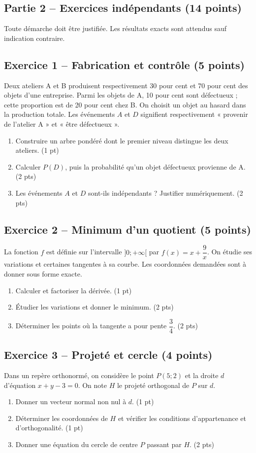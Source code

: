 \clearpage\subsection*{Partie 2 -- Exercices indépendants (14 points)}
Toute démarche doit être justifiée. Les résultats exacts sont attendus sauf indication contraire.
\subsection*{Exercice 1 -- Fabrication et contrôle (5 points)}
Deux ateliers A et B produisent respectivement 30 pour cent et 70 pour cent des objets d’une entreprise. Parmi les objets de A, 10 pour cent sont défectueux ; cette proportion est de 20 pour cent chez B. On choisit un objet au hasard dans la production totale. Les événements $A$ et $D$ signifient respectivement « provenir de l’atelier A » et « être défectueux ».
\begin{enumerate}
\item Construire un arbre pondéré dont le premier niveau distingue les deux ateliers. \hfill(1 pt)
\item Calculer $P(D)$, puis la probabilité qu’un objet défectueux provienne de A. \hfill(2 pts)
\item Les événements $A$ et $D$ sont-ils indépendants ? Justifier numériquement. \hfill(2 pts)
\end{enumerate}
\subsection*{Exercice 2 -- Minimum d’un quotient (5 points)}
La fonction $f$ est définie sur l’intervalle $]0;+\infty[$ par $f(x)=x+\dfrac9x$. On étudie ses variations et certaines tangentes à sa courbe. Les coordonnées demandées sont à donner sous forme exacte.
\begin{enumerate}
\item Calculer et factoriser la dérivée. \hfill(1 pt)
\item Étudier les variations et donner le minimum. \hfill(2 pts)
\item Déterminer les points où la tangente a pour pente $\dfrac{3}{4}$. \hfill(2 pts)
\end{enumerate}
\subsection*{Exercice 3 -- Projeté et cercle (4 points)}
Dans un repère orthonormé, on considère le point $P(5;2)$ et la droite $d$ d’équation $x+y-3=0$. On note $H$ le projeté orthogonal de $P$ sur $d$.
\begin{enumerate}
\item Donner un vecteur normal non nul à $d$. \hfill(1 pt)
\item Déterminer les coordonnées de $H$ et vérifier les conditions d’appartenance et d’orthogonalité. \hfill(1 pt)
\item Donner une équation du cercle de centre $P$ passant par $H$. \hfill(2 pts)
\end{enumerate}
